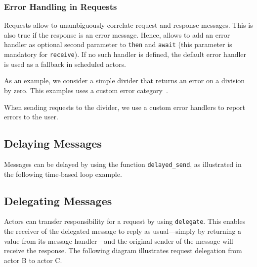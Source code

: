 \clearpage
\subsubsection{Error Handling in Requests}
\label{error-response}

Requests allow \lib to unambiguously correlate request and response messages. This is also true if the response is an error message. Hence, \lib allows to add an error handler as optional second parameter to \lstinline^then^ and \lstinline^await^ (this parameter is mandatory for \lstinline^receive^). If no such handler is defined, the default error handler  is used as a fallback in scheduled actors.

As an example, we consider a simple divider that returns an error on a division by zero. This examples uses a custom error category~.



When sending requests to the divider, we use a custom error handlers to report errors to the user.



\clearpage
\subsection{Delaying Messages}
\label{delay-message}

Messages can be delayed by using the function \lstinline^delayed_send^, as illustrated in the following time-based loop example. 



\clearpage
\subsection{Delegating Messages}
\label{delegate}

Actors can transfer responsibility for a request by using \lstinline^delegate^. This enables the receiver of the delegated message to reply as usual---simply by returning a value from its message handler---and the original sender of the message will receive the response. The following diagram illustrates request delegation from actor B to actor C.


